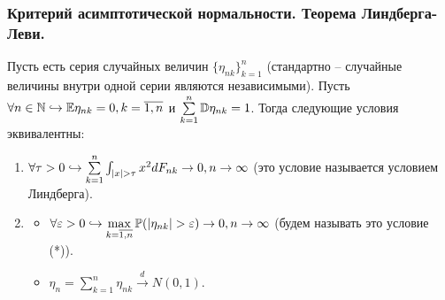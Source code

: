 \subsubsection{Критерий асимптотической нормальности. Теорема Линдберга-Леви.}
\begin{theorem}
    Пусть есть серия случайных величин $\{\eta_{nk}\}_{k = 1}^n$ (стандартно -- случайные величины внутри одной серии являются независимыми).
    Пусть $ \forall n \in \mathbb{N} \hookrightarrow \mathbb{E} \eta_{nk} = 0, k = \overline{1, n}$ и $\sum\limits_{k = 1}^{n} \mathbb{D} \eta_{nk} = 1$.
    Тогда следующие условия эквивалентны:
    \begin{enumerate}
        \item $\forall \tau > 0 \hookrightarrow \sum\limits_{k = 1}^{n} \int_{|x| > \tau} x^2 dF_{nk} \rightarrow 0, n \rightarrow \infty$ (это условие называется условием Линдберга).
        \item \begin{itemize}
                  \item $\forall \varepsilon > 0 \hookrightarrow \max\limits_{k = \overline{1, n}} \mathbb{P}(|\eta_{nk}| > \varepsilon) \rightarrow 0, n \rightarrow \infty$ (будем называть это условие (*)).
                  \item $\eta_n = \sum\limits_{k = 1}^{n} \eta_{nk} \xrightarrow{d} N(0, 1)$.
        \end{itemize}
    \end{enumerate}
\end{theorem}
